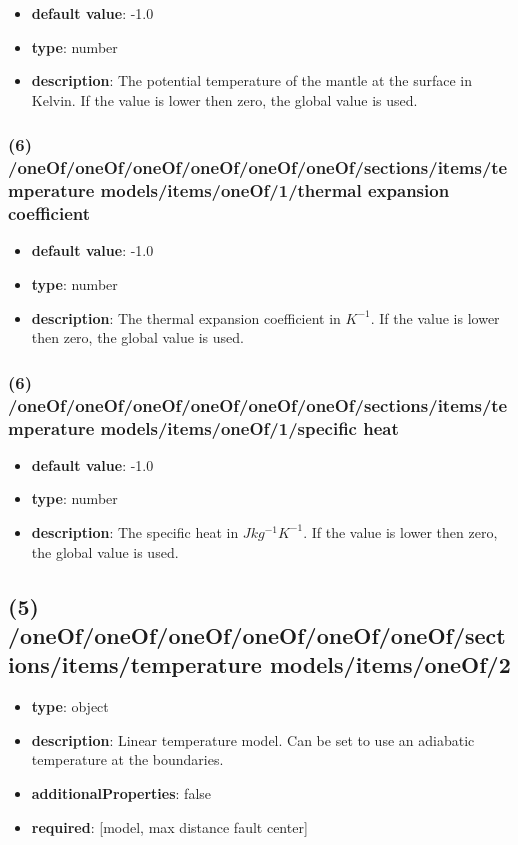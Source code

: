 \begin{itemize}[leftmargin=6em]\item {\bf default value}: -1.0
\item {\bf type}: number
\item {\bf description}: The potential temperature of the mantle at the surface in Kelvin. If the value is lower then zero, the global value is used.
\end{itemize}\subsubsection{(6) /oneOf/oneOf/oneOf/oneOf/oneOf/oneOf/sections/items/temperature models/items/oneOf/1/thermal expansion coefficient}
\begin{itemize}[leftmargin=6em]\item {\bf default value}: -1.0
\item {\bf type}: number
\item {\bf description}: The thermal expansion coefficient in $K^{-1}$. If the value is lower then zero, the global value is used.
\end{itemize}\subsubsection{(6) /oneOf/oneOf/oneOf/oneOf/oneOf/oneOf/sections/items/temperature models/items/oneOf/1/specific heat}
\begin{itemize}[leftmargin=6em]\item {\bf default value}: -1.0
\item {\bf type}: number
\item {\bf description}: The specific heat in $J kg^{-1} K^{-1}$. If the value is lower then zero, the global value is used.
\end{itemize}\subsection{(5) /oneOf/oneOf/oneOf/oneOf/oneOf/oneOf/sections/items/temperature models/items/oneOf/2}
\begin{itemize}[leftmargin=5em]\item {\bf type}: object
\item {\bf description}: Linear temperature model. Can be set to use an adiabatic temperature at the boundaries.
\item {\bf additionalProperties}: false
\item {\bf required}: [model, max distance fault center]\end{itemize}
